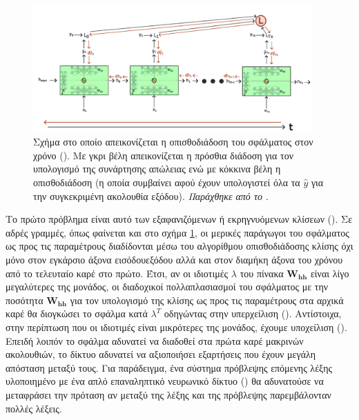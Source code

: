 \begin{figure}[h]
  \centering
  \includegraphics[width=0.95\textwidth]{images/chapter theoritical background/rnn_unroled_BPTT.pdf}
  \caption{Σχήμα στο οποίο απεικονίζεται η οπισθοδιάδοση του σφάλματος στον χρόνο (). Με γκρι βέλη απεικονίζεται η πρόσθια διάδοση για τον υπολογισμό της συνάρτησης απώλειας ενώ με κόκκινα βέλη η οπισθοδιάδοση (η οποία συμβαίνει αφού έχουν υπολογιστεί όλα τα $\hat{y}$ για την συγκεκριμένη ακολουθία εξόδου). \textit{Παράχθηκε από το \href{https://inkscape.org/}{}}.}
  \label{fig:rnn_bptt}
\end{figure}

Το πρώτο πρόβλημα είναι αυτό των εξαφανιζόμενων ή εκρηγνυόμενων κλίσεων (). Σε αδρές γραμμές, όπως φαίνεται και στο σχήμα \ref{fig:rnn_bptt}, οι μερικές παράγωγοι του σφάλματος ως προς τις παραμέτρους διαδίδονται μέσω του αλγορίθμου οπισθοδιάδοσης κλίσης όχι μόνο στον εγκάρσιο άξονα εισόδου\textendash εξόδου αλλά και στον διαμήκη άξονα του χρόνου από το τελευταίο καρέ στο πρώτο. Έτσι, αν οι ιδιοτιμές $\lambda$ του πίνακα $\boldsymbol{W_{hh}}$ είναι λίγο μεγαλύτερες της μονάδος, οι διαδοχικοί πολλαπλασιασμοί του σφάλματος με την ποσότητα $\boldsymbol{W_{hh}}$ για τον υπολογισμό της κλίσης ως προς τις παραμέτρους στα αρχικά καρέ θα διογκώσει το σφάλμα κατά ${\lambda}^{T}$ οδηγώντας στην υπερχείλιση (). Αντίστοιχα, στην περίπτωση που οι ιδιοτιμές είναι μικρότερες της μονάδος, έχουμε υποχείλιση (). Επειδή λοιπόν το σφάλμα αδυνατεί να διαδοθεί στα πρώτα καρέ μακρινών ακολουθιών, το δίκτυο αδυνατεί να αξιοποιήσει εξαρτήσεις που έχουν μεγάλη απόσταση μεταξύ τους. Για παράδειγμα, ένα σύστημα πρόβλεψης επόμενης λέξης υλοποιημένο με ένα απλό επαναληπτικό νευρωνικό δίκτυο () θα αδυνατούσε να μεταφράσει την πρόταση  αν μεταξύ της λέξης  και της πρόβλεψης παρεμβάλονταν πολλές λέξεις. \par

